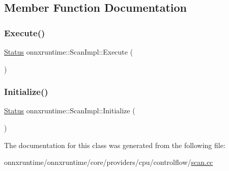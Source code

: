 \subsection{Member Function Documentation}
\mbox{\label{classonnxruntime_1_1ScanImpl_a3e0418181e208aa98999582ff93c3d62}} 
\subsubsection{\texorpdfstring{Execute()}{Execute()}}
{\footnotesize\ttfamily \mbox{\hyperlink{classonnxruntime_1_1common_1_1Status}{Status}} onnxruntime\+::\+Scan\+Impl\+::\+Execute (\begin{DoxyParamCaption}{ }\end{DoxyParamCaption})}

\mbox{\label{classonnxruntime_1_1ScanImpl_a04f68d9cf61a52cb26e380ddc9fcdb7f}} 
\subsubsection{\texorpdfstring{Initialize()}{Initialize()}}
{\footnotesize\ttfamily \mbox{\hyperlink{classonnxruntime_1_1common_1_1Status}{Status}} onnxruntime\+::\+Scan\+Impl\+::\+Initialize (\begin{DoxyParamCaption}{ }\end{DoxyParamCaption})}



The documentation for this class was generated from the following file\+:\begin{DoxyCompactItemize}
\item 
onnxruntime/onnxruntime/core/providers/cpu/controlflow/\mbox{\hyperlink{scan_8cc}{scan.\+cc}}\end{DoxyCompactItemize}
